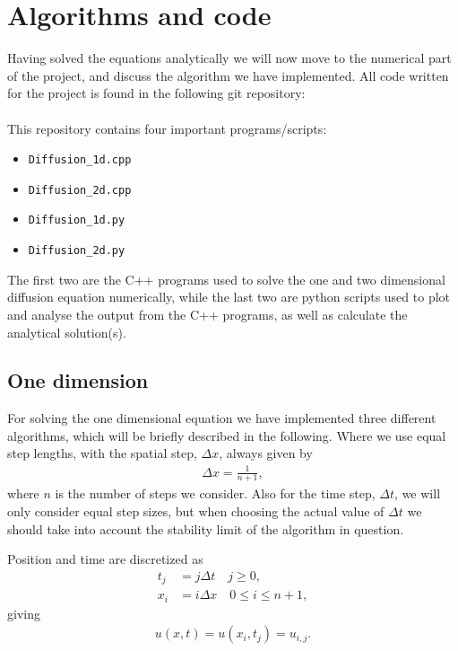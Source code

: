 \documentclass[12pt, a4paper]{article}
\begin{document}
\section{Algorithms and code}  

Having solved the equations analytically we will now move to the numerical part of the project, and 
discuss the algorithm we have implemented. All code written for the project is found in 
the following git repository: \vspace{0.5cm} \\ 
 \vspace{0.5cm} \\ 
This repository contains four important programs/scripts: 
\begin{itemize}
\item \texttt{Diffusion\_1d.cpp}
\item \texttt{Diffusion\_2d.cpp}
\item \texttt{Diffusion\_1d.py}
\item \texttt{Diffusion\_2d.py}
\end{itemize}
The first two are the C++ programs used to solve the one and two dimensional diffusion equation
numerically, while the last two are python scripts used to plot and analyse the output from the 
C++ programs, as well as calculate the analytical solution(s). 

\subsection{One dimension}

For solving the one dimensional equation we have implemented three different algorithms, which will
be briefly described in the following. Where we use equal step lengths, with the spatial step, $\Delta x$, 
always given by 
\begin{align*}
\Delta x = \frac{1}{n+1},  
\end{align*}  
where $n$ is the number of steps we consider. Also for the time step, $\Delta t$, we will only consider 
equal step sizes, but when choosing the actual value of $\Delta t$ we should take into account the 
stability limit of the algorithm in question. 

Position and time are discretized as 
\begin{align*}
t_j & = j\Delta t \quad j\geq 0,  \\
x_i & = i \Delta x \quad 0 \leq i \leq n+1,  
\end{align*} 
giving 
\begin{align*}
u(x,t) = u(x_i, t_j) = u_{i,j}. 
\end{align*}
\end{document}
